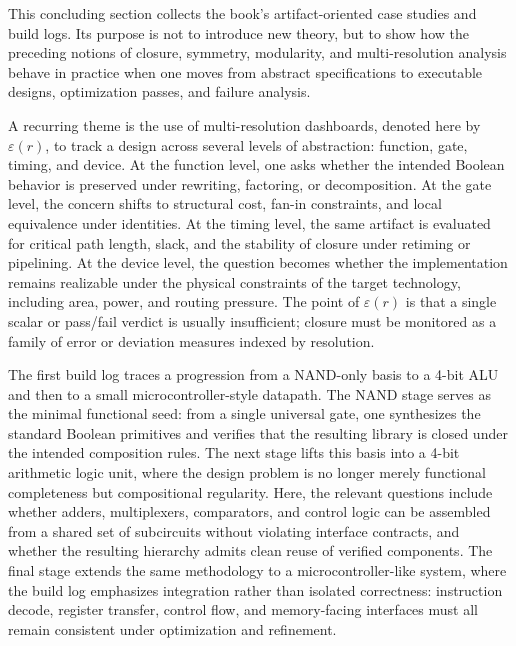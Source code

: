 This concluding section collects the book's artifact-oriented case studies and build logs. Its purpose is not to introduce new theory, but to show how the preceding notions of closure, symmetry, modularity, and multi-resolution analysis behave in practice when one moves from abstract specifications to executable designs, optimization passes, and failure analysis.

A recurring theme is the use of multi-resolution dashboards, denoted here by \(\varepsilon(r)\), to track a design across several levels of abstraction: function, gate, timing, and device. At the function level, one asks whether the intended Boolean behavior is preserved under rewriting, factoring, or decomposition. At the gate level, the concern shifts to structural cost, fan-in constraints, and local equivalence under identities. At the timing level, the same artifact is evaluated for critical path length, slack, and the stability of closure under retiming or pipelining. At the device level, the question becomes whether the implementation remains realizable under the physical constraints of the target technology, including area, power, and routing pressure. The point of \(\varepsilon(r)\) is that a single scalar or pass/fail verdict is usually insufficient; closure must be monitored as a family of error or deviation measures indexed by resolution.

The first build log traces a progression from a NAND-only basis to a 4-bit ALU and then to a small microcontroller-style datapath. The NAND stage serves as the minimal functional seed: from a single universal gate, one synthesizes the standard Boolean primitives and verifies that the resulting library is closed under the intended composition rules. The next stage lifts this basis into a 4-bit arithmetic logic unit, where the design problem is no longer merely functional completeness but compositional regularity. Here, the relevant questions include whether adders, multiplexers, comparators, and control logic can be assembled from a shared set of subcircuits without violating interface contracts, and whether the resulting hierarchy admits clean reuse of verified components. The final stage extends the same methodology to a microcontroller-like system, where the build log emphasizes integration rather than isolated correctness: instruction decode, register transfer, control flow, and memory-facing interfaces must all remain consistent under optimization and refinement.

